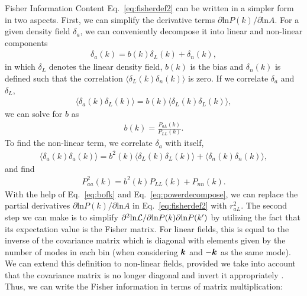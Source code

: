 \begin{section}{Fisher Information Content}
  Eq.~\ref{eq:fisherdef2} can be written in a simpler
  form in two aspects.   First, we can simplify the derivative terms
  $\partial \mathrm{ln} P(k)/\partial\mathrm{ln} A$.  For a given density field $\delta_a$, we can
  conveniently decompose it into linear and non-linear components
  \begin{align}
    \delta_a(k) = b (k) \delta _L (k) + \delta_{n}(k),
    \label{eq:decompose}
  \end{align}
  in which $\delta_L$ denotes the linear density field, $b(k)$ is the
  bias and $\delta_{n}(k)$ is defined such that the correlation
  $\langle \delta_L(k)\delta_{n}(k) \rangle$ is zero.  If we correlate
  $\delta_a$ and $\delta_L$,
  \begin{align}
    \langle \delta_a(k)\delta_L(k) \rangle = b(k) \langle \delta_L(k)\delta_L(k) \rangle,
    \label{eq:correlating}
  \end{align} 
  we can solve for $b$ as
  \begin{align}
    b (k) = \frac{P _{aL}(k)}{P_{LL}(k)}.
    \label{eq:bofk}
  \end{align}
  To find the non-linear term, we correlate $\delta_a$ with itself,
  \begin{align}
    \langle \delta_a(k) \delta_a(k) \rangle = 
    b^2(k) \langle \delta_L(k) \delta_L(k) \rangle + \langle \delta_{n}(k)\delta_{n}(k) \rangle,
  \end{align}
  and find
  \begin{align}
    P_{aa}^2 (k) = b^2(k) P_{LL} (k) + P_{nn} (k).
    \label{eq:powerdecompose}
  \end{align}
  With the help of Eq.~\ref{eq:bofk} and Eq.~\ref{eq:powerdecompose},
  we can replace the partial derivatives
  $\partial \mathrm{ln} P(k) / \partial \mathrm{ln} A$ in
  Eq.~\ref{eq:fisherdef2} with $r^2_{aL}$.
  The second step we can make is to simplify
  $\partial ^2 \mathrm{ln \mathcal{L}}/\partial \mathrm{ln} P(k) \partial
  \mathrm{ln} P(k')$
  by utilizing the fact that its expectation value is the Fisher
  matrix.  For linear fields, this is equal to the inverse of the
  covariance matrix which is diagonal with elements given by the
  number of modes in each bin (when considering $\boldsymbol{k}$ and $-\boldsymbol{k}$ as the same mode).  
  We can extend this definition to
  non-linear fields, provided we take into account that the covariance
  matrix is no longer diagonal and invert it appropriately \cite{bib:Rimes2006}.  Thus, we
  can write the Fisher information in terms of matrix multiplication:
  \begin{align}

\end{align}
\end{section}
